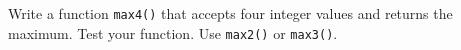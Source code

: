 Write a function \texttt{max4()} that accepts four integer values and returns the maximum. Test your function. Use \texttt{max2()} or \texttt{max3()}.

